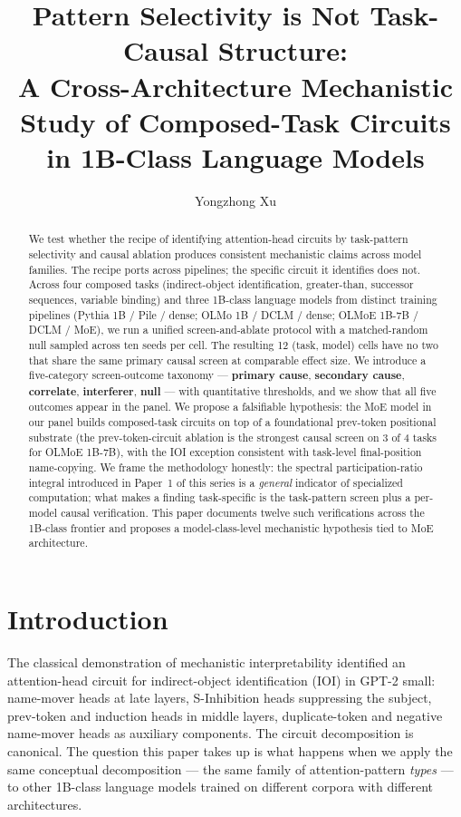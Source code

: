 \documentclass[11pt]{article}
\title{Pattern Selectivity is Not Task-Causal Structure:\\
A Cross-Architecture Mechanistic Study of Composed-Task Circuits\\
in 1B-Class Language Models}
\author{Yongzhong Xu}
\date{}
\begin{document}
\maketitle

\begin{abstract}
\noindent
We test whether the recipe of identifying attention-head circuits by task-pattern selectivity and causal ablation produces consistent mechanistic claims across model families. The recipe ports across pipelines; the specific circuit it identifies does not. Across four composed tasks (indirect-object identification, greater-than, successor sequences, variable binding) and three 1B-class language models from distinct training pipelines (Pythia 1B / Pile / dense; OLMo 1B / DCLM / dense; OLMoE 1B-7B / DCLM / MoE), we run a unified screen-and-ablate protocol with a matched-random null sampled across ten seeds per cell. The resulting 12 (task, model) cells have no two that share the same primary causal screen at comparable effect size. We introduce a five-category screen-outcome taxonomy --- \textbf{primary cause}, \textbf{secondary cause}, \textbf{correlate}, \textbf{interferer}, \textbf{null} --- with quantitative thresholds, and we show that all five outcomes appear in the panel. We propose a falsifiable hypothesis: the MoE model in our panel builds composed-task circuits on top of a foundational prev-token positional substrate (the prev-token-circuit ablation is the strongest causal screen on 3 of 4 tasks for OLMoE 1B-7B), with the IOI exception consistent with task-level final-position name-copying. We frame the methodology honestly: the spectral participation-ratio integral introduced in Paper~1 of this series is a \emph{general} indicator of specialized computation; what makes a finding task-specific is the task-pattern screen plus a per-model causal verification. This paper documents twelve such verifications across the 1B-class frontier and proposes a model-class-level mechanistic hypothesis tied to MoE architecture.
\end{abstract}

\section{Introduction}
\label{sec:intro}

The classical demonstration of mechanistic interpretability \citep{wang2022ioi} identified an attention-head circuit for indirect-object identification (IOI) in GPT-2 small: name-mover heads at late layers, S-Inhibition heads suppressing the subject, prev-token and induction heads in middle layers, duplicate-token and negative name-mover heads as auxiliary components. The circuit decomposition is canonical. The question this paper takes up is what happens when we apply the same conceptual decomposition --- the same family of attention-pattern \emph{types} --- to other 1B-class language models trained on different corpora with different architectures.
\end{document}
